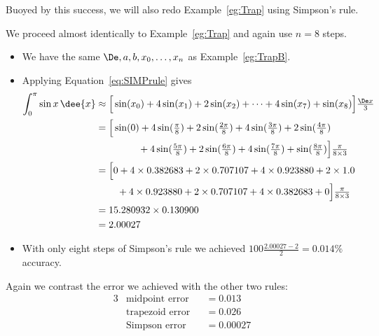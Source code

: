 Buoyed by this success, we will also redo Example~\ref{eg:Trap} using Simpson's rule.
\begin{eg}\label{eg:Simpson}
\soln We proceed almost identically to Example~\ref{eg:Trap} and again use $n=8$ steps.
\begin{itemize}
 \item We have the same $\De,a,b,x_0,\dots, x_n$ as Example~\ref{eg:TrapB}.
 \item Applying Equation~\ref{eq:SIMPrule} gives
\begin{align*}
\int_0^\pi\sin x\,\dee{x}
&\approx
\Big[\sin(x_0)+4\sin(x_1)+2\sin(x_2)+\cdots+4\sin(x_7)+\sin(x_8)\Big]\tfrac{\De x}{3}\\
&=\Big[\sin(0)+
             4\sin(\tfrac{\pi}{8})+
             2\sin(\tfrac{2\pi}{8})+
             4\sin(\tfrac{3\pi}{8})+
             2\sin(\tfrac{4\pi}{8})\cr
&\phantom{=\Big[\sin(0)\,}
+4\sin(\tfrac{5\pi}{8})+
             2\sin(\tfrac{6\pi}{8})+
             4\sin(\tfrac{7\pi}{8})+
             \sin(\tfrac{8\pi}{8})\Big]\tfrac{\pi}{8\times 3}\cr
&=\Big[ 0+
            4\times 0.382683+
            2\times 0.707107+
            4\times 0.923880+
            2\times 1.0\\
&\phantom{=\Big[ 0\,}+
            4\times 0.923880+
            2\times 0.707107+
            4\times 0.382683+0\Big]\tfrac{\pi}{8\times 3}\\
&=15.280932\times 0.130900\\
&=2.00027
\end{align*}
\item With only eight steps  of Simpson's rule we  achieved
$100\tfrac{2.00027-2}{2}=0.014\%$ accuracy.
\end{itemize}
\end{eg}
Again we contrast the error we achieved with the other two rules:
\begin{alignat*}{3}
&\text{midpoint error} &&= 0.013\\
&\text{trapezoid error} &&= 0.026\\
&\text{Simpson error} &&= 0.00027
\end{alignat*}


